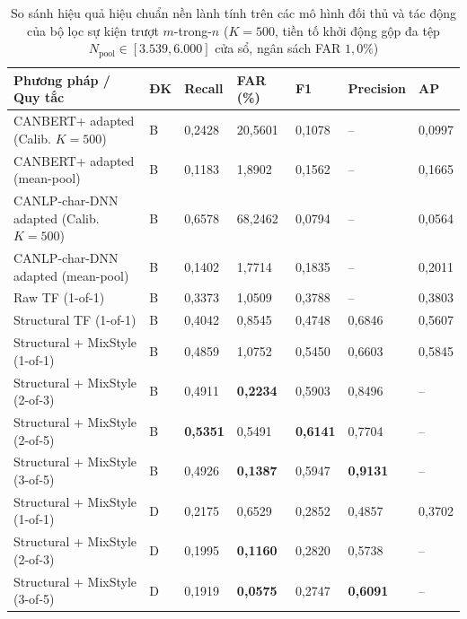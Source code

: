 \documentclass[12pt, a4paper, reqno, oneside]{book}
\begin{document}
{\renewcommand{\arraystretch}{0.84}
\begin{table}[htbp]\centering\footnotesize\setlength{\tabcolsep}{4pt}
\caption[Đối chứng hiệu chuẩn nền lành tính cho đối thủ và bộ lọc sự kiện $m$-trong-$n$]{So sánh hiệu quả hiệu chuẩn nền lành tính trên các mô hình đối thủ và tác động của bộ lọc sự kiện trượt $m$-trong-$n$ ($K=500$, tiền tố khởi động gộp đa tệp $N_{\text{pool}} \in [3.539, 6.000]$ cửa sổ, ngân sách FAR $1{,}0\%$)}\label{tab:cal-baselines-mofn}
\begin{tabular}{P{4.2cm}P{0.9cm}P{1.6cm}P{1.6cm}P{1.6cm}P{1.65cm}P{1.3cm}}
\toprule
Phương pháp / Quy tắc & ĐK & Recall & FAR (\%) & F1 & Precision & AP\\\midrule
CANBERT+ adapted (Calib. $K=500$) & B & 0,2428 & 20,5601 & 0,1078 & -- & 0,0997\\
CANBERT+ adapted (mean-pool) & B & 0,1183 & 1,8902 & 0,1562 & -- & 0,1665\\
CANLP-char-DNN adapted (Calib. $K=500$) & B & 0,6578 & 68,2462 & 0,0794 & -- & 0,0564\\
CANLP-char-DNN adapted (mean-pool) & B & 0,1402 & 1,7714 & 0,1835 & -- & 0,2011\\
Raw TF (1-of-1) & B & 0,3373 & 1,0509 & 0,3788 & -- & 0,3803\\
Structural TF (1-of-1) & B & 0,4042 & 0,8545 & 0,4748 & 0,6846 & 0,5607\\
Structural + MixStyle (1-of-1) & B & 0,4859 & 1,0752 & 0,5450 & 0,6603 & 0,5845\\
Structural + MixStyle (2-of-3) & B & 0,4911 & \textbf{0,2234} & 0,5903 & 0,8496 & --\\
Structural + MixStyle (2-of-5) & B & \textbf{0,5351} & 0,5491 & \textbf{0,6141} & 0,7704 & --\\
Structural + MixStyle (3-of-5) & B & 0,4926 & \textbf{0,1387} & 0,5947 & \textbf{0,9131} & --\\
\midrule
Structural + MixStyle (1-of-1) & D & 0,2175 & 0,6529 & 0,2852 & 0,4857 & 0,3702\\
Structural + MixStyle (2-of-3) & D & 0,1995 & \textbf{0,1160} & 0,2820 & 0,5738 & --\\
Structural + MixStyle (3-of-5) & D & 0,1919 & \textbf{0,0575} & 0,2747 & \textbf{0,6091} & --\\
\bottomrule\end{tabular}
\end{table}}
\end{document}

